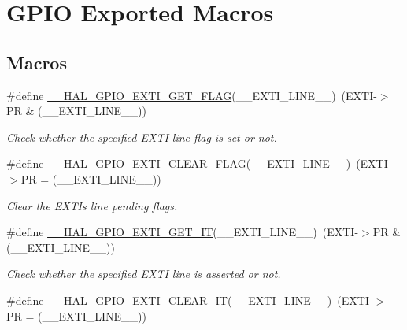 \hypertarget{group___g_p_i_o___exported___macros}{}\section{G\+P\+IO Exported Macros}
\label{group___g_p_i_o___exported___macros}
\subsection*{Macros}
\begin{DoxyCompactItemize}
\item 
\#define \hyperlink{group___g_p_i_o___exported___macros_gaae18fc8d92ffa4df2172c78869e712fc}{\+\_\+\+\_\+\+H\+A\+L\+\_\+\+G\+P\+I\+O\+\_\+\+E\+X\+T\+I\+\_\+\+G\+E\+T\+\_\+\+F\+L\+AG}(\+\_\+\+\_\+\+E\+X\+T\+I\+\_\+\+L\+I\+N\+E\+\_\+\+\_\+)~(E\+X\+TI-\/$>$PR \& (\+\_\+\+\_\+\+E\+X\+T\+I\+\_\+\+L\+I\+N\+E\+\_\+\+\_\+))
\begin{DoxyCompactList}\small\item\em Check whether the specified E\+X\+TI line flag is set or not. \end{DoxyCompactList}\item 
\#define \hyperlink{group___g_p_i_o___exported___macros_ga2f28fc349d1812cdc55a77c68d2b278d}{\+\_\+\+\_\+\+H\+A\+L\+\_\+\+G\+P\+I\+O\+\_\+\+E\+X\+T\+I\+\_\+\+C\+L\+E\+A\+R\+\_\+\+F\+L\+AG}(\+\_\+\+\_\+\+E\+X\+T\+I\+\_\+\+L\+I\+N\+E\+\_\+\+\_\+)~(E\+X\+TI-\/$>$PR = (\+\_\+\+\_\+\+E\+X\+T\+I\+\_\+\+L\+I\+N\+E\+\_\+\+\_\+))
\begin{DoxyCompactList}\small\item\em Clear the E\+X\+TI\textquotesingle{}s line pending flags. \end{DoxyCompactList}\item 
\#define \hyperlink{group___g_p_i_o___exported___macros_ga27f0e1f6c38745169d74620f6a178a94}{\+\_\+\+\_\+\+H\+A\+L\+\_\+\+G\+P\+I\+O\+\_\+\+E\+X\+T\+I\+\_\+\+G\+E\+T\+\_\+\+IT}(\+\_\+\+\_\+\+E\+X\+T\+I\+\_\+\+L\+I\+N\+E\+\_\+\+\_\+)~(E\+X\+TI-\/$>$PR \& (\+\_\+\+\_\+\+E\+X\+T\+I\+\_\+\+L\+I\+N\+E\+\_\+\+\_\+))
\begin{DoxyCompactList}\small\item\em Check whether the specified E\+X\+TI line is asserted or not. \end{DoxyCompactList}\item 
\#define \hyperlink{group___g_p_i_o___exported___macros_ga2a086506eec826f49b200fba64beb9f1}{\+\_\+\+\_\+\+H\+A\+L\+\_\+\+G\+P\+I\+O\+\_\+\+E\+X\+T\+I\+\_\+\+C\+L\+E\+A\+R\+\_\+\+IT}(\+\_\+\+\_\+\+E\+X\+T\+I\+\_\+\+L\+I\+N\+E\+\_\+\+\_\+)~(E\+X\+TI-\/$>$PR = (\+\_\+\+\_\+\+E\+X\+T\+I\+\_\+\+L\+I\+N\+E\+\_\+\+\_\+))

\end{DoxyCompactItemize}
